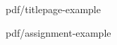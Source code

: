 \documentclass[%
  12pt,       				%
  a4paper,    				%
  oneside,      			%
	unicode,						%
]{report}				    	%
\begin{document}
\pagestyle{empty}      %


  {pdf/titlepage-example}%
\oddpage%
   
  {pdf/assignment-example}%
\oddpage%

\makeabstract

\makedeclaration

\makeacknowledgement

\tableofcontents

\listoffigures

\listoftables

\lstlistoflistings

\cleardoublepage\pagestyle{plain}   %
\end{document}
